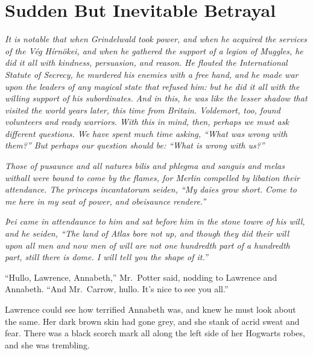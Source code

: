 \hypertarget{sudden-but-inevitable-betrayal}{%
\chapter{Sudden But Inevitable
Betrayal}\label{sudden-but-inevitable-betrayal}}

\emph{It is notable that when Grindelwald took power, and when he
acquired the services of the Vég Hírnökei, and when he gathered the
support of a legion of Muggles, he did it all with kindness, persuasion,
and reason. He flouted the International Statute of Secrecy, he murdered
his enemies with a free hand, and he made war upon the leaders of any
magical state that refused him: but he did it all with the willing
support of his subordinates. And in this, he was like the lesser shadow
that visited the world years later, this time from Britain. Voldemort,
too, found volunteers and ready warriors. With this in mind, then,
perhaps we must ask different questions. We have spent much time asking,
``What was wrong with them?'' But perhaps our question should be: ``What
is wrong with us?''}


\mybreak

\emph{Those of pusaunce and all natures bilis and phlegma and sanguis
and melas withall were bound to come by the flames, for Merlin compelled
by libation their attendance. The princeps incantatorum seiden, ``My
daies grow short. Come to me here in my seat of power, and obeisaunce
rendere.''}

\emph{Þei came in attendaunce to him and sat before him in the stone
towre of his will, and he seiden, ``The land of Atlas bore not up, and
though they did their will upon all men and now men of will are not one
hundredth part of a hundredth part, still there is dome. I will tell you
the shape of it.''}


\mybreak

``Hullo, Lawrence, Annabeth,'' Mr.~Potter said, nodding to Lawrence and
Annabeth. ``And Mr.~Carrow, hullo. It's nice to see you all.''

Lawrence could see how terrified Annabeth was, and knew he must look
about the same. Her dark brown skin had gone grey, and she stank of
acrid sweat and fear. There was a black scorch mark all along the left
side of her Hogwarts robes, and she was trembling.

